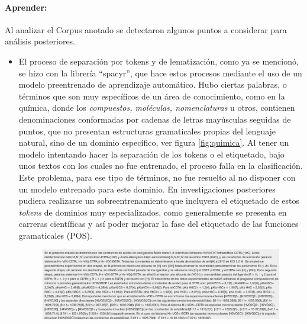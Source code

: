 \documentclass[
  12pt,
  openany]{book}
\begin{document}
\hypertarget{aprender-3}{%
\paragraph{Aprender:}\label{aprender-3}}

Al analizar el Corpus anotado se detectaron algunos puntos a considerar para análisis posteriores.

\begin{itemize}
\item
  El proceso de separación por tokens y de lematización, como ya se mencionó, se hizo con la librería ``spacyr'', que hace estos procesos mediante el uso de un modelo preentrenado de aprendizaje automático. Hubo ciertas palabras, o términos que son muy específicos de un área de conocimiento, como en la química, donde los \emph{compuestos, moléculas, nomenclaturas} u otros, contienen denominaciones conformadas por cadenas de letras mayúsculas seguidas de puntos, que no presentan estructuras gramaticales propias del lenguaje natural, sino de un dominio específico, ver figura \ref{fig:quimica}. Al tener un modelo intentando hacer la separación de los tokens o el etiquetado, bajo unos textos con los cuales no fue entrenado, el proceso falla en la clasificación. Este problema, para ese tipo de términos, no fue resuelto al no disponer con un modelo entrenado para este dominio. En investigaciones posteriores pudiera realizarse un sobreentrenamiento que incluyera el etiquetado de estos \emph{tokens} de dominios muy especializados, como generalmente se presenta en carreras científicas y así poder mejorar la fase del etiquetado de las funciones gramaticales (POS).

  \begin{figure}

  {\centering \includegraphics[width=0.85\linewidth]{images/05-desarrollo/2_ciclo/quimica} 

  }


\end{figure}
\end{itemize}
\end{document}

